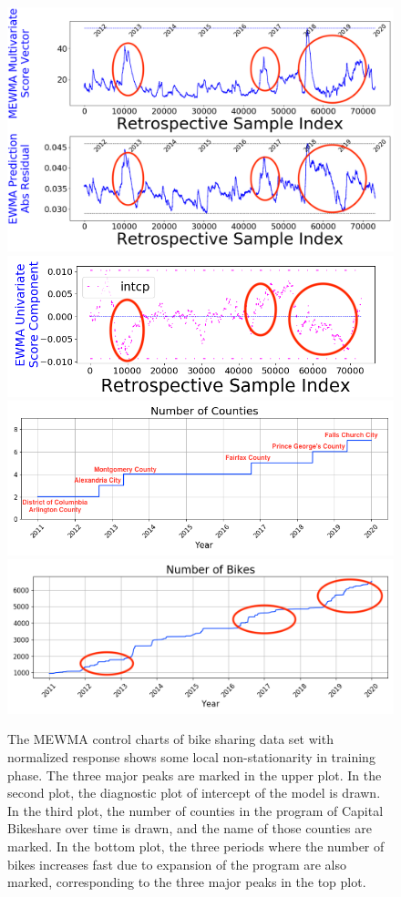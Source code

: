 \documentclass[twoside,11pt]{article}
\begin{document}
\begin{figure}[!htbp]
\centering
\includegraphics[width=.5\textwidth, trim=.0in 4.58in .0in .0in, clip]{../figures/v14/bike_sharing/reg_nnet_numer_norm_syr_10_pow_tr_10/marked_train_bike_reg_1e-06_0_0001_0_0005_99_99.png}
\includegraphics[width = 0.53\linewidth, trim=.0in .in .0in 0.0in, clip]{../figures/v14/bike_sharing/reg_lin_cat_norm_syr_10_pow_tr_10/mark_training_pos_single_train_bike_fisher_mlines_with_regu_1e-08_0_0001_0_0005_99_99.png}
\includegraphics[width = 0.47\linewidth]{../figures/v14/bike_sharing/marked_plot_num_counties.png}\linebreak
\includegraphics[width = 0.5\linewidth]{../figures/v14/bike_sharing/marked_plot_num_bikes.png}
  \caption{
The MEWMA control charts of bike sharing data set with normalized response shows some local non-stationarity in training phase. The three major peaks are marked in the upper plot. In the second plot, the diagnostic plot of intercept of the model is drawn. In the third plot, the number of counties in the program of Capital Bikeshare over time is drawn, and the name of those counties are marked. In the bottom plot, the three periods where the number of bikes increases fast due to expansion of the program are also marked, corresponding to the three major peaks in the top plot.
}
\label{fig:bike_sharing_interp}
\end{figure}
\end{document}
